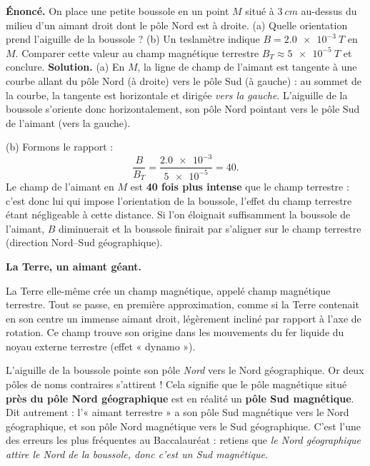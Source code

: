 \documentclass[11pt]{article}
\newcommand{\cle}[1]{{\popxbold\color{popdark}#1}}
\newcounter{popsec}
\newcounter{popsub}
\newcommand{\courssub}[1]{%
  \stepcounter{popsub}%
  \par\vspace{9pt}\noindent{\popxbold\fontsize{11.5}{13}\selectfont\color{popink}{\color{poporange}\thepopsec.\thepopsub}\hspace{6pt}#1}\par\nopagebreak\vspace{4pt}
}
\begin{document}
\begin{exoresolu}
\textbf{Énoncé.} On place une petite boussole en un point $M$ situé à $\SI{3}{cm}$ au-dessus du milieu d'un aimant droit dont le pôle Nord est à droite. (a) Quelle orientation prend l'aiguille de la boussole ? (b) Un teslamètre indique $B = \SI{2,0e-3}{T}$ en $M$. Comparer cette valeur au champ magnétique terrestre $B_T \approx \SI{5e-5}{T}$ et conclure.
\tcblower
\textbf{Solution.} (a) En $M$, la ligne de champ de l'aimant est tangente à une courbe allant du pôle Nord (à droite) vers le pôle Sud (à gauche) : au sommet de la courbe, la tangente est horizontale et dirigée \emph{vers la gauche}. L'aiguille de la boussole s'oriente donc horizontalement, son pôle Nord pointant vers le pôle Sud de l'aimant (vers la gauche).

(b) Formons le rapport :
\[ \frac{B}{B_T} = \frac{\num{2,0e-3}}{\num{5e-5}} = 40. \]
Le champ de l'aimant en $M$ est \textbf{40 fois plus intense} que le champ terrestre : c'est donc lui qui impose l'orientation de la boussole, l'effet du champ terrestre étant négligeable à cette distance. Si l'on éloignait suffisamment la boussole de l'aimant, $B$ diminuerait et la boussole finirait par s'aligner sur le champ terrestre (direction Nord--Sud géographique).
\end{exoresolu}

\courssub{Le champ magnétique terrestre}

\textbf{La Terre, un aimant géant.}\par

La Terre elle-même crée un champ magnétique, appelé \cle{champ magnétique terrestre}. Tout se passe, en première approximation, comme si la Terre contenait en son centre un immense aimant droit, légèrement incliné par rapport à l'axe de rotation. Ce champ trouve son origine dans les mouvements du fer liquide du noyau externe terrestre (effet « dynamo »).

\begin{attention}
L'aiguille de la boussole pointe son pôle \emph{Nord} vers le Nord géographique. Or deux pôles de noms contraires s'attirent ! Cela signifie que le pôle magnétique situé \textbf{près du pôle Nord géographique} est en réalité un \textbf{pôle Sud magnétique}. Dit autrement : l'« aimant terrestre » a son pôle Sud magnétique vers le Nord géographique, et son pôle Nord magnétique vers le Sud géographique. C'est l'une des erreurs les plus fréquentes au Baccalauréat : retiens que \emph{le Nord géographique attire le Nord de la boussole, donc c'est un Sud magnétique}.
\end{attention}
\end{document}
